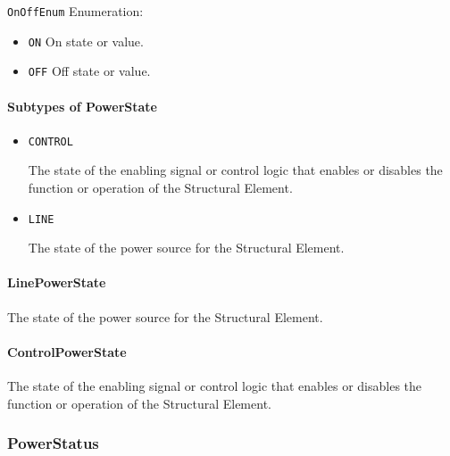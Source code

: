 \texttt{OnOffEnum} Enumeration:

\begin{itemize}
\item \texttt{ON} \newline On state or value. 
\item \texttt{OFF} \newline Off state or value. 
\end{itemize}

\FloatBarrier

\paragraph{Subtypes of PowerState}\mbox{}
\label{sec:Subtypes of PowerState}

\begin{itemize}

\item \texttt{CONTROL}


The state of the enabling signal or control logic that enables or disables the function or operation of the \gls{Structural Element}.

\item \texttt{LINE}


The state of the power source for the \gls{Structural Element}.


\end{itemize}

\paragraph{LinePowerState}\mbox{}
\label{sec:LinePowerState}


The state of the power source for the \gls{Structural Element}.


\paragraph{ControlPowerState}\mbox{}
\label{sec:ControlPowerState}


The state of the enabling signal or control logic that enables or disables the function or operation of the \gls{Structural Element}.


\subsubsection{PowerStatus}
\label{sec:PowerStatus}



